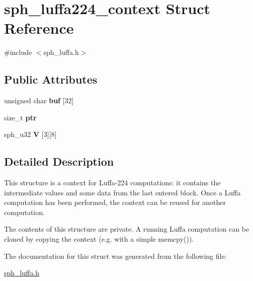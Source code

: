 \hypertarget{structsph__luffa224__context}{}\section{sph\+\_\+luffa224\+\_\+context Struct Reference}
\label{structsph__luffa224__context}


{\ttfamily \#include $<$sph\+\_\+luffa.\+h$>$}

\subsection*{Public Attributes}
\begin{DoxyCompactItemize}
\item 
\mbox{\label{structsph__luffa224__context_ad6cc353326e629ce48de2486870ff0b6}} 
unsigned char {\bfseries buf} \mbox{[}32\mbox{]}
\item 
\mbox{\label{structsph__luffa224__context_a9b262de3994c59a1cbea33de785355c8}} 
size\+\_\+t {\bfseries ptr}
\item 
\mbox{\label{structsph__luffa224__context_ad2adb6333eb0d783338dcf17866d91dd}} 
sph\+\_\+u32 {\bfseries V} \mbox{[}3\mbox{]}\mbox{[}8\mbox{]}
\end{DoxyCompactItemize}


\subsection{Detailed Description}
This structure is a context for Luffa-\/224 computations\+: it contains the intermediate values and some data from the last entered block. Once a Luffa computation has been performed, the context can be reused for another computation.

The contents of this structure are private. A running Luffa computation can be cloned by copying the context (e.\+g. with a simple {\ttfamily memcpy()}). 

The documentation for this struct was generated from the following file\+:\begin{DoxyCompactItemize}
\item 
\mbox{\hyperlink{sph__luffa_8h}{sph\+\_\+luffa.\+h}}\end{DoxyCompactItemize}
